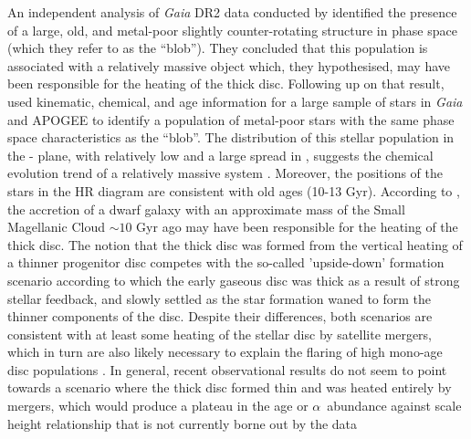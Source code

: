 An independent analysis of \emph{Gaia} DR2 data conducted by
\citet{2018ApJ...860L..11K} identified the presence of a large,
old, and metal-poor slightly counter-rotating structure in phase
space (which they refer to as the ``blob'').  They concluded that
this population is associated with a relatively massive object
which, they hypothesised, may have been responsible for the heating
of the thick disc.  Following up on that result,
\citet{2018arXiv180606038H} used kinematic, chemical, and age
information for a large sample of stars in \emph{Gaia} and APOGEE
to identify a population of metal-poor stars with the same phase
space characteristics as the ``blob''.  The distribution of this
stellar population in the \afe{}-\feh{} plane, with relatively low
\afe{} and a large spread in \feh{}, suggests the chemical evolution
trend of a relatively massive system \citep[the recent preprint posting of][hints at a similar conclusion, also on the basis of APOGEE data]{2018arXiv180707269F}.  Moreover, the positions of
the stars in the HR diagram are consistent with old ages (10-13
Gyr).  According to  \citet{2018arXiv180606038H}, the accretion of
a dwarf galaxy with an approximate mass of the Small Magellanic
Cloud \citep[necessary to explain the chemistry of this accreted
population,][]{2018ApJ...852...49H} $\sim 10$ Gyr ago may have been
responsible for the heating of the thick disc. The notion that the
thick disc was formed from the vertical heating of a thinner
progenitor disc competes with the so-called 'upside-down' formation
scenario \citep[see, e.g][]{2013ApJ...773...43B,2017arXiv170901040N}
according to which the early gaseous disc was thick as a result of
strong stellar feedback, and slowly settled as the star formation
waned to form the thinner components of the disc.  Despite their
differences, both scenarios are consistent with at least some heating
of the stellar disc by satellite mergers, which in turn are also
likely necessary to explain the flaring of high \afe{} mono-age
disc populations \citep[e.g.][]{2015ApJ...804L...9M,2017arXiv170600018M}.
In general, recent observational results do not seem to point towards
a scenario where the thick disc formed thin and was heated entirely
by mergers, which would produce a plateau in the age or $\alpha$~abundance
against scale height relationship that is not currently borne out
by the data
\citep[e.g.][]{2012ApJ...751..131B,2012ApJ...753..148B,2012ApJ...755..115B,2016ApJ...823...30B,2016MNRAS.455..987C,2017arXiv170600018M}

